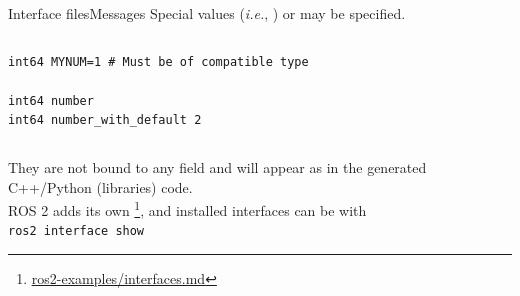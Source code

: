 \begin{frame}[fragile]{Interface files}{Messages}
	\justifying
	Special values (\emph{i.e.}, ) or  may be specified.

	\begin{columns}
		\begin{lstlisting}[language=ros2msg, caption=Definition of an example message with a constant and a default value.]
int64 MYNUM=1 # Must be of compatible type

int64 number
int64 number_with_default 2
    \end{lstlisting}
	\end{columns}

	They are not bound to any field and will appear as  in the generated C++/Python (libraries) code.\\
	ROS 2 adds its own \footnote{\href{https://github.com/IntelligentSystemsLabUTV/ros2-examples/blob/jazzy/interfaces.md}{\color{blue}\underline{ros2-examples/interfaces.md}}}, and installed interfaces can be  with\\
  \medskip
	\texttt{ros2 interface show}
\end{frame}

